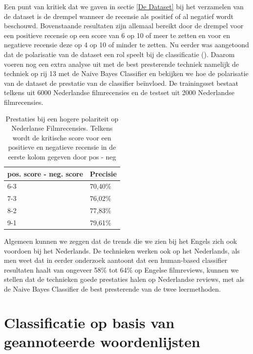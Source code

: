 Een punt van kritiek dat we gaven in sectie \ref{De Dataset} bij het verzamelen van de dataset is de drempel wanneer de recensie als positief of al negatief wordt beschouwd. Bovenstaande resultaten zijn allemaal bereikt door de drempel voor een positieve recensie op een score van 6 op 10 of meer te zetten en voor en negatieve recensie deze op 4 op 10 of minder te zetten.
Nu eerder was aangetoond dat de polarisatie van de dataset een rol speelt bij de classificatie (\cite{maas-EtAl:2011:ACL-HLT2011}). Daarom voeren nog een extra analyse uit met de best presterende techniek namelijk de techniek op rij 13 met de Naive Bayes Classifier en bekijken we hoe de polarisatie van de dataset de prestatie van de classifier be\"invloed. De trainingsset bestaat telkens uit 6000 Nederlandse filmrecensies en de testset uit 2000 Nederlandse filmrecensies.


\begin{table}[h]
\centering
\caption{Prestaties bij een hogere polariteit op Nederlanse Filmrecensies. Telkens wordt de kritische score voor een positieve en negatieve recensie in de eerste kolom gegeven door pos - neg  }
\begin{tabular}{|l|l|}
\hline
\cline{2-2}
pos. score - neg. score    & Precisie \\ \hline
\multicolumn{1}{|l|}{6-3} & 70,40\%  \\ \hline
\multicolumn{1}{|l|}{7-3} & 76,02\%  \\ \hline
\multicolumn{1}{|l|}{8-2} & 77,83\%  \\ \hline
\multicolumn{1}{|l|}{9-1} & 79,61\%  \\ \hline
\end{tabular}
\end{table}


Algemeen kunnen we zeggen dat de trends die we zien bij het Engels zich ook voordoen bij het Nederlands. De technieken werken ook op het Nederlands, als men weet dat in eerder onderzoek \cite{pang2002thumbs} aantoont dat een human-based classifier resultaten haalt van ongeveer 58\% tot 64\% op Engelse filmreviews, kunnen we stellen dat de technieken goede prestaties halen op Nederlandse reviews, met als de Naive Bayes Classifier de best presterende van de twee leermethoden.


\section{Classificatie op basis van geannoteerde woordenlijsten}\label{Classificatie op basis van geannoteerde woordenlijsten}

